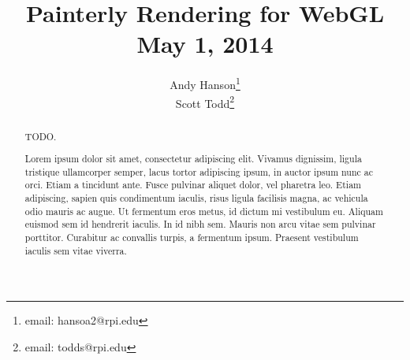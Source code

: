 \documentclass[conference]{acmsiggraph}
\title{Painterly Rendering for WebGL \\ May 1, 2014}
\author{Andy Hanson\thanks{email: hansoa2@rpi.edu}\\
        Scott Todd\thanks{email: todds@rpi.edu}}
\begin{document}

\maketitle

\begin{abstract}

TODO.

Lorem ipsum dolor sit amet, consectetur adipiscing elit. Vivamus dignissim, ligula tristique ullamcorper semper, lacus tortor adipiscing ipsum, in auctor ipsum nunc ac orci. Etiam a tincidunt ante. Fusce pulvinar aliquet dolor, vel pharetra leo. Etiam adipiscing, sapien quis condimentum iaculis, risus ligula facilisis magna, ac vehicula odio mauris ac augue. Ut fermentum eros metus, id dictum mi vestibulum eu. Aliquam euismod sem id hendrerit iaculis. In id nibh sem. Mauris non arcu vitae sem pulvinar porttitor. Curabitur ac convallis turpis, a fermentum ipsum. Praesent vestibulum iaculis sem vitae viverra.

\end{abstract}



\keywordlist


\TOGlinkslist
\end{document}
